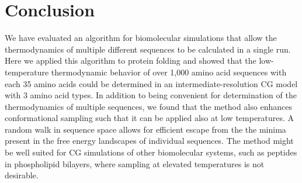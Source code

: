 \documentclass[
aip,
rsi,%
amsmath,amssymb,
reprint,%
]{revtex4-1}
\begin{document}
\section{Conclusion}
\noindent
We have evaluated an algorithm for biomolecular simulations that allow the thermodynamics of multiple different sequences to be calculated in a single run. Here we applied this algorithm to protein folding and showed that the low-temperature thermodynamic behavior of over 1,000 amino acid sequences with each 35 amino acids could be determined in an intermediate-resolution CG model with 3 amino acid types. In addition to being convenient for determination of the thermodynamics of multiple sequences, we found that the method also enhances conformational sampling such that it can be applied also at low temperatures. A random walk in sequence space allows for efficient escape from the the minima present in the free energy landscapes of individual sequences. The method might be well suited for CG simulations of other biomolecular systems, such as peptides in phospholipid bilayers, where sampling at elevated temperatures is not desirable. 


\end{document}
